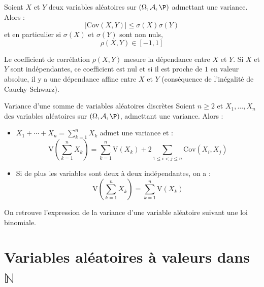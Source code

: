 \documentclass[french,11pt,twoside]{VcCours}
\begin{document}
\begin{Proposition}{} Soient $X$ et $Y$ deux variables aléatoires sur $(\Omega, \mathcal{A}, \P)$ admettant une variance. Alors :
$$ \vert \textrm{Cov}(X,Y) \vert \leq \sigma(X) \sigma(Y)$$
et en particulier si $\sigma(X)$ et $\sigma(Y)$ sont non nuls, 
$$ \rho(X,Y) \in [-1,1]$$
\end{Proposition}

\begin{Demonstration}{}

\vspace{4cm}
\end{Demonstration}

\begin{Remarque}{} Le coefficient de corrélation $\rho(X,Y)$ \og mesure la dépendance \fg entre $X$ et $Y$. Si $X$ et $Y$ sont indépendantes, ce coefficient est nul et si il est proche de $1$ en valeur absolue, il y a une \og dépendance affine \fg entre $X$ et $Y$ (conséquence de l'inégalité de Cauchy-Schwarz).
\end{Remarque}

\begin{Proposition}{Variance d'une somme de variables aléatoires discrètes}
Soient $n \geq 2$ et $X_1, \ldots, X_n$ des variables aléatoires sur $(\Omega, \mathcal{A}, \P)$, admettant une variance. Alors :
\begin{itemize}
\item $X_1 + \cdots + X_n = \sum_{k=1}^n X_k$ admet une variance et :
$$ \textrm{V} \left(\sum_{k=1}^n X_k \right) = \sum_{k=1}^n \textrm{V}(X_k) + 2 \sum_{1\leq i<j \leq n} \textrm{Cov}(X_i,X_j)$$
\item Si de plus les variables sont deux à deux indépendantes, on a :
$$ \textrm{V} \left(\sum_{k=1}^n X_k \right) = \sum_{k=1}^n \textrm{V}(X_k)$$
\end{itemize}
\end{Proposition}

\begin{Demonstration}{}
\vspace{10cm}
\end{Demonstration}

\begin{Remarque}{} On retrouve l'expression de la variance d'une variable aléatoire suivant une loi binomiale.

\vspace{5cm}
\end{Remarque}

\section{Variables aléatoires à valeurs dans \texorpdfstring{$\mathbb{N}$}{ℕ}}
\end{document}
